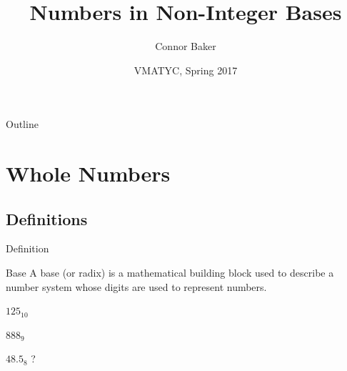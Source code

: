 \documentclass{beamer}
\title{Numbers in Non-Integer Bases}
\author{Connor Baker}
\institute{NVCC} %
\date{VMATYC, Spring 2017}
\begin{document}
\begin{frame}
  \titlepage
\end{frame}

\begin{frame}{Outline}
  \tableofcontents
\end{frame}


\section{Whole Numbers}










\subsection{Definitions}
\begin{frame}{Definition}
  \begin{block}{Base}
    A base (or radix) is a mathematical building block used to describe a number system whose digits are used to represent numbers.
  \end{block}\pause

  \begin{example}
    $125_{10}$ \pause

    $888_9$ \pause

    $48.5_8$ \pause ?
  \end{example}
\end{frame}
\end{document}
